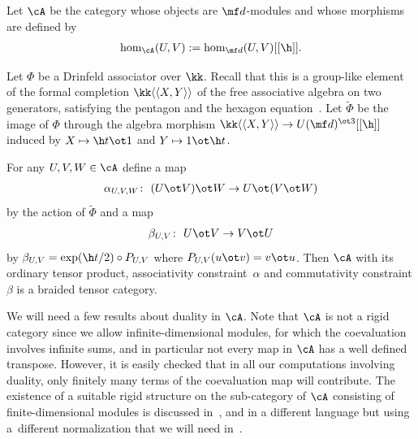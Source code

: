 Let $\cA$ be the category whose objects are $\mf d$-modules and whose morphisms are def\/ined by
\begin{gather*}
	\hom_\cA(U,V):=\hom_{\mf d}(U,V)[[\h]].
\end{gather*}

Let $\Phi$ be a Drinfeld associator over $\kk$. Recall that this is a group-like element of the formal completion $\kk\langle\langle X,Y\rangle\rangle$ of the free associative algebra on two generators, satisfying the pentagon and the hexagon equation~\cite{Drinfeld1990a}. Let $\tilde\Phi$ be the image of $\Phi$ through the algebra morphism $\kk\langle\langle X,Y\rangle\rangle \rightarrow U(\mf d)^{\ot 3}[[\h]]$ induced by $X\mapsto \h t\ot 1$ and $Y\mapsto 1\ot \h t$.
	\begin{thm}
For any $U,V,W \in \cA$ define a map
\begin{gather*}
	\alpha_{U,V,W}\colon \ (U\ot V)\ot W \rightarrow U\ot (V \ot W)
\end{gather*}
by the action of $\tilde \Phi$ and a map
\begin{gather*}
	\beta_{U,V}\colon \ U\ot V \rightarrow V \ot U
\end{gather*}
by $\beta_{U,V}=\exp(\h t/2)\circ P_{U,V}$ where $P_{U,V}(u\ot v)=v\ot u$. Then $\cA$ with its ordinary tensor product, associativity constraint~$\alpha$ and commutativity constraint $\beta$ is a braided tensor category.
\end{thm}

We will need a few results about duality in $\cA$. Note that $\cA$ is not a rigid category since we allow inf\/inite-dimensional modules, for which the coevaluation involves inf\/inite sums, and in particular not every map in $\cA$ has a well def\/ined transpose. However, it is easily checked that in all our computations involving duality, only f\/initely many terms of the coevaluation map will contribute. The existence of a suitable rigid structure on the sub-category of $\cA$ consisting of f\/inite-dimensional modules is discussed in~\cite{Cartier1993,Drinfeld1990,Kassel1998}, and in a dif\/ferent language but using a~dif\/ferent normalization that we will need in~\cite{Le1995,Le1997}.

